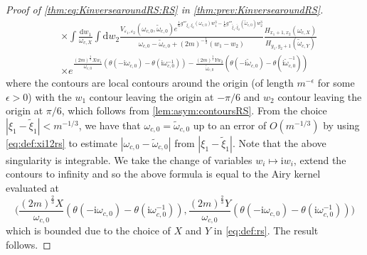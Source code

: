 \documentclass[11pt,twoside]{amsart}
\theoremstyle{plain}
\numberwithin{quest}{section}
\theoremstyle{remark}
\numberwithin{rem}{section}
\theoremstyle{definition}
\newcommand{\eps}{\varepsilon}
\begin{document}
\begin{proof}[Proof of \eqref{thm:eq:KinversearoundRS:RS} in \cref{thm:prev:KinversearoundRS}]
\begin{equation*}
\begin{split}
				&\times \int \frac{\mathrm{d}w_1}{\omega_{c,X}} \int \mathrm{d}w_2 \frac{V_{\eps_1,\eps_2}(\omega_{c,0},\tilde{\omega}_{c,0})e^{\frac{1}{6}g'''_{\xi_1,\xi_2}(\omega_{c,0})w_1^3-\frac{1}{6}g'''_{\tilde{\xi}_1,\tilde{\xi}_2}(\tilde{\omega}_{c,0})w_2^3}}{\omega_{c,0} - \tilde{\omega}_{c,0}+(2m)^{-\frac{1}{3}}(w_1-w_2)}  \frac{H_{x_1+1,x_2}(\omega_{c,X})}{H_{y_1,y_2+1}(\tilde{\omega}_{c,Y})} \\
				&\times e^{\frac{(2m)^{\frac{2}{3}}Xw_1}{\omega_{c,0}} (\theta (-\mathrm{i}\omega_{c,0})-\theta(\mathrm{i}\omega_{c,0}^{-1}))-\frac{(2m)^{\frac{2}{3}}Yw_2}{\tilde{\omega}_{c,0}} (\theta (-\mathrm{i}\tilde{\omega}_{c,0})-\theta(\mathrm{i}\tilde{\omega}_{c,0}^{-1}))}
			\end{split}
		\end{equation*}
		where the contours are local contours around the origin (of length $m^{-\epsilon}$ for some $\epsilon>0$) with the $w_1$ contour leaving the origin at $-\pi/6$ and $w_2$ contour leaving the origin at $\pi/6$, which follows from \cref{lem:asym:contoursRS}.  From the choice $|\xi_1-\tilde{\xi}_1|<m^{-1/3}$, we have that  $\omega_{c,0}=\tilde{\omega}_{c,0}$ up to an error of $O(m^{-1/3})$ by using \eqref{eq:def:xi12rs} to estimate $|\omega_{c,0}-\tilde{\omega}_{c,0}|$ from $|\xi_1-\tilde{\xi}_1|$.  Note that the above singularity is integrable.  We take the change of variables $w_i\mapsto \mathrm{i}w_i$, extend the contours to infinity and so the above formula is equal to the Airy kernel evaluated at 
		$$
		\bigg(\frac{(2m)^{\frac{2}{3}}X}{\omega_{c,0}} (\theta (-\mathrm{i}\omega_{c,0})-\theta(\mathrm{i}\omega_{c,0}^{-1})),\frac{(2m)^{\frac{2}{3}}Y}{{\omega}_{c,0}} (\theta (-\mathrm{i}{\omega}_{c,0})-\theta(\mathrm{i}{\omega}_{c,0}^{-1}))\bigg)
		$$
		which is bounded due to the choice of $X$ and $Y$ in \eqref{eq:def:rs}.  The result follows. 
		
		
		
	\end{proof}
	
\end{document}

